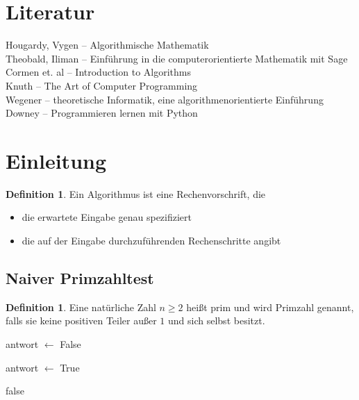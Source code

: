 \documentclass[a4paper,12pt]{article}
\theoremstyle{definition}
\newtheorem{definition}[axiom]{Definition}
\begin{document}
	\section{Literatur}
	Hougardy, Vygen -- Algorithmische Mathematik\\[2ex]
	Theobald, Iliman -- Einführung in die computerorientierte Mathematik mit Sage\\[2ex]
	Cormen et. al -- Introduction to Algorithms\\[2ex]
	Knuth -- The Art of Computer Programming\\[2ex]
	Wegener -- theoretische Informatik, eine algorithmenorientierte Einführung\\[2ex]
	Downey -- Programmieren lernen mit Python
	
	\section{Einleitung}
	\begin{definition}
		Ein Algorithmus ist eine Rechenvorschrift, die
		\begin{itemize}
			\item die erwartete Eingabe genau spezifiziert
			\item die auf der Eingabe durchzuführenden Rechenschritte angibt
		\end{itemize}
	\end{definition}
	
	\subsection{Naiver Primzahltest}
	\begin{definition}
		Eine natürliche Zahl $n \geq 2$ heißt prim und wird Primzahl genannt, falls sie keine positiven Teiler außer $1$ und sich selbst besitzt.
	\end{definition}
	\begin{algorithm}
		\begin{algorithmic}
			
			antwort $\gets$ False
			\Else
			
			antwort $\gets$ True
			\EndIf
			
			
			
			\Return false
			\EndIf
			\EndFor
		\end{algorithmic}
	\end{algorithm}
	
\end{document}
